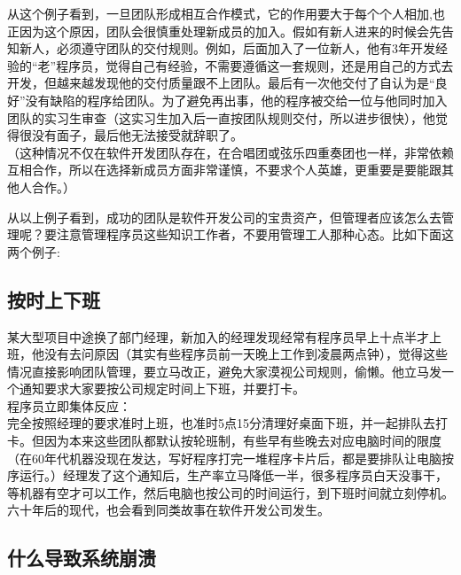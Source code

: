 从这个例子看到，一旦团队形成相互合作模式，它的作用要大于每个个人相加,也正因为这个原因，团队会很慎重处理新成员的加入。假如有新人进来的时候会先告知新人，必须遵守团队的交付规则。例如，后面加入了一位新人，他有3年开发经验的``老''程序员，觉得自己有经验，不需要遵循这一套规则，还是用自己的方式去开发，但越来越发现他的交付质量跟不上团队。最后有一次他交付了自认为是``良好''没有缺陷的程序给团队。为了避免再出事，他的程序被交给一位与他同时加入团队的实习生审查（这实习生加入后一直按团队规则交付，所以进步很快），他觉得很没有面子，最后他无法接受就辞职了。\\
（这种情况不仅在软件开发团队存在，在合唱团或弦乐四重奏团也一样，非常依赖互相合作，所以在选择新成员方面非常谨慎，不要求个人英雄，更重要是要能跟其他人合作。）

从以上例子看到，成功的团队是软件开发公司的宝贵资产，但管理者应该怎么去管理呢？要注意管理程序员这些知识工作者，不要用管理工人那种心态。比如下面这两个例子:\\

\hypertarget{ux6309ux65f6ux4e0aux4e0bux73ed}{%
\subsection{按时上下班}\label{ux6309ux65f6ux4e0aux4e0bux73ed}}

某大型项目中途换了部门经理，新加入的经理发现经常有程序员早上十点半才上班，他没有去问原因（其实有些程序员前一天晚上工作到凌晨两点钟），觉得这些情况直接影响团队管理，要立马改正，避免大家漠视公司规则，偷懒。他立马发一个通知要求大家要按公司规定时间上下班，并要打卡。\\
程序员立即集体反应：\\
完全按照经理的要求准时上班，也准时5点15分清理好桌面下班，并一起排队去打卡。但因为本来这些团队都默认按轮班制，有些早有些晚去对应电脑时间的限度（在60年代机器没现在发达，写好程序打完一堆程序卡片后，都是要排队让电脑按序运行。）经理发了这个通知后，生产率立马降低一半，很多程序员白天没事干，等机器有空才可以工作，然后电脑也按公司的时间运行，到下班时间就立刻停机。\\
六十年后的现代，也会看到同类故事在软件开发公司发生。\\

\hypertarget{ux4ec0ux4e48ux5bfcux81f4ux7cfbux7edfux5d29ux6e83}{%
\subsection{什么导致系统崩溃}\label{ux4ec0ux4e48ux5bfcux81f4ux7cfbux7edfux5d29ux6e83}}


